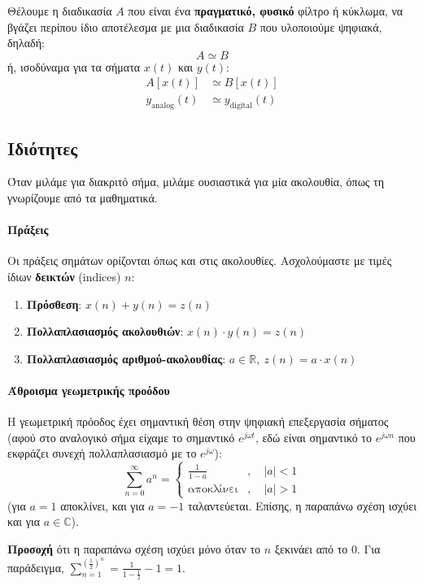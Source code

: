 \documentclass[11pt,a4paper,notitlepage,fleqn]{article}
\begin{document}
Θέλουμε η διαδικασία \( A \) που είναι ένα \textbf{πραγματικό, φυσικό} φίλτρο ή κύκλωμα, να βγάζει
περίπου ίδιο αποτέλεσμα με μια διαδικασία \( B \) που υλοποιούμε ψηφιακά, δηλαδή:
\[
A \simeq B
\]
ή, ισοδύναμα για τα σήματα \( x(t) \) και \( y(t) \):
\begin{align*}
	A\left[x(t)\right] &\simeq B\left[x(t)\right] \\
	y_{\mathrm{analog}}(t) &\simeq y_{\mathrm{digital}}(t)
\end{align*}

\subsection{Ιδιότητες}
Όταν μιλάμε για διακριτό σήμα, μιλάμε ουσιαστικά για μία ακολουθία, όπως τη γνωρίζουμε από τα μαθηματικά.

\paragraph{Πράξεις}
Οι πράξεις σημάτων ορίζονται όπως και στις ακολουθίες. Ασχολούμαστε με τιμές ίδιων \textbf{δεικτών} (indices) \( n \):
\begin{enumerate}
	\item \textbf{Πρόσθεση}: \( x(n) + y(n) = z(n) \)
	\item \textbf{Πολλαπλασιασμός ακολουθιών}: \( x(n) \cdot y(n) = z(n) \)
	\item \textbf{Πολλαπλασιασμός αριθμού-ακολουθίας}: \( a\in\mathbb R,\ z(n) = a\cdot x(n) \)
\end{enumerate}

\paragraph{Άθροισμα γεωμετρικής προόδου}
Η γεωμετρική πρόοδος έχει σημαντική θέση στην ψηφιακή επεξεργασία σήματος (αφού στο αναλογικό σήμα
είχαμε το σημαντικό \( e^{j\omega t} \), εδώ είναι σημαντικό το \( e^{j\omega n} \) που εκφράζει συνεχή πολλαπλασιασμό με το \( e^{j\omega } \)):
\[
\sum_{n=0}^{\infty} a^n
= \begin{cases}
\displaystyle \frac{1}{1-a} &,\quad |a|<1\\
\text{αποκλίνει}&,\quad |a|>1
\end{cases}
\]
(για \( a=1 \) αποκλίνει, και για \( a=-1 \) ταλαντεύεται. Επίσης, η παραπάνω σχέση ισχύει και για
\( a\in\mathbb C \)).

\textbf{Προσοχή} ότι η παραπάνω σχέση ισχύει μόνο όταν το \( n \) ξεκινάει από το 0. Για παράδειγμα,
\( \sum_{n=1}^{\left(\frac{1}{2}\right)^n} = \frac{1}{1-\frac{1}{2}}-1 = 1 \).
\end{document}
